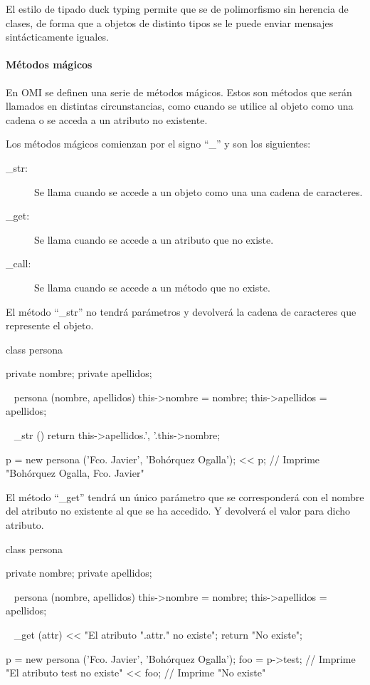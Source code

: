 El estilo de tipado duck typing permite que se de polimorfismo sin herencia de 
clases, de forma que a objetos de distinto tipos se le puede enviar mensajes sintácticamente iguales.  

\paragraph {Métodos mágicos} \label{sec:magic_method}

En OMI se definen una serie de métodos mágicos. Estos son métodos que serán 
llamados en distintas circunstancias, como cuando se utilice al objeto 
como una cadena o se acceda a un atributo no existente. 

Los métodos mágicos comienzan por el signo ``\_'' y son los siguientes: 

\begin{description}
\item[\_str:] Se llama cuando se accede a un objeto como una una cadena de caracteres.
\item[\_get:] Se llama cuando se accede a un atributo que no existe.
\item[\_call:] Se llama cuando se accede a un método que no existe.
\end{description}

El método ``\_str'' no tendrá parámetros y devolverá la cadena de caracteres que
represente el objeto. 

\begin{myverbatim}
   class persona {
      private nombre;
      private apellidos;
      
      ~ persona (nombre, apellidos) {
         this->nombre = nombre;
         this->apellidos = apellidos;
      }
      
      ~ _str () {
         return this->apellidos.', '.this->nombre;
      }
      
   }
   
   p = new persona ('Fco. Javier', 'Bohórquez Ogalla');
   << p; // Imprime "Bohórquez Ogalla, Fco. Javier"
   
\end{myverbatim}

El método ``\_get'' tendrá un único parámetro que se corresponderá con 
el nombre del atributo no existente al que se ha accedido. Y devolverá 
el valor para dicho atributo. \\

\begin{myverbatim}
   class persona {
      private nombre;
      private apellidos;
      
      ~ persona (nombre, apellidos) {
         this->nombre = nombre;
         this->apellidos = apellidos;
      }
      
      ~ _get (attr) {
         << "El atributo ".attr." no existe";
         return "No existe";
      }
      
   }
   
   p = new persona ('Fco. Javier', 'Bohórquez Ogalla');
   foo = p->test; // Imprime "El atributo test no existe"
   << foo; // Imprime "No existe"
\end{myverbatim}

